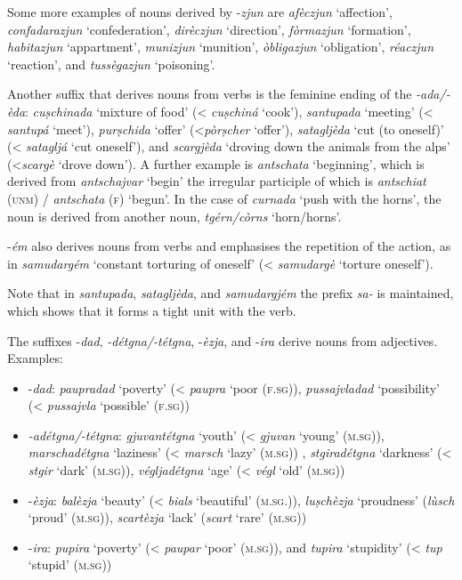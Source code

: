 Some more examples of nouns derived by -\textit{zjun} are \textit{afèczjun} `affection', \textit{confadarazjun} `confederation', \textit{dirèczjun} `direction', \textit{fòrmazjun} `formation', \textit{habitazjun} `appartment', \textit{munizjun} `munition', \textit{òbligazjun} `obligation', \textit{réaczjun} `reaction', and \textit{tussègazjun} `poisoning'.

Another suffix that derives nouns from verbs is the feminine ending of the  \textit{-ada/-èda}: \textit{cuṣchinada} `mixture of food' (< \textit{cuṣchiná} `cook'), \textit{santupada} `meeting' (< \textit{santupá} `meet'), \textit{purṣchida} `offer' (<\textit{pòrṣcher} `offer'), \textit{satagljèda} `cut (to oneself)' (< \textit{satagljá} `cut oneself'), and \textit{scargjèda} `droving down the animals from the alps' (<\textit{scargè} `drove down'). A further example is \textit{antschata} `beginning', which is derived from \textit{antschajvar} `begin' the irregular participle of which is \textit{antschiat} (\textsc{unm}) / \textit{antschata} (\textsc{f}) `begun'. In the case of \textit{curnada} `push with the horns', the noun is derived from another noun, \textit{tgérn/còrns} `horn/horns'.

-\textit{ém} also derives nouns from verbs and emphasises the repetition of the action, as in \textit{samudargém} `constant torturing of oneself' (< \textit{samudargè} `torture oneself').

Note that in \textit{santupada}, \textit{satagljèda}, and \textit{samudargjém} the  prefix \textit{sa-} is maintained, which shows that it forms a tight unit with the verb.

The suffixes -\textit{dad}, \textit{-détgna/-tétgna}, -\textit{èzja}, and -\textit{ira} derive nouns from adjectives. Examples:

\begin{itemize}
	\item -\textit{dad}: \textit{paupradad} `poverty' (< \textit{paupra} `poor (\textsc{f.sg})), \textit{pussajvladad} `possibility' (< \textit{pussajvla} `possible' (\textsc{f.sg}))
	
	\item \textit{-adétgna/-tétgna}: \textit{gjuvantétgna} `youth' (< \textit{gjuvan} `young' \textsc{(m.sg})), \textit{marschadétgna} `laziness' (< \textit{marsch} `lazy' (\textsc{m.sg})) , \textit{stgiradétgna} `darkness' (< \textit{stgir} `dark' (\textsc{m.sg})), \textit{végljadétgna} `age' (< \textit{végl} `old' (\textsc{m.sg}))
	
	\item -\textit{èzja}: \textit{balèzja} `beauty' (< \textit{bials} `beautiful' (\textsc{m.sg.})), \textit{luṣchèzja} `proudness' (\textit{lùsch} `proud' \textsc{(m.sg})), \textit{scartèzja} `lack' (\textit{scart} `rare' (\textsc{m.sg}))
	
	\item -\textit{ira}: \textit{pupira} `poverty' (< \textit{paupar} `poor' \textsc{(m.sg})), and \textit{tupira} `stupidity' (< \textit{tup} `stupid' \textsc{(m.sg}))
\end{itemize}

